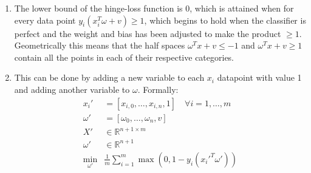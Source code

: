 \documentclass[11pt]{article}
\begin{document}
\begin{solution}
\begin{enumerate}
    \item The lower bound of the hinge-loss function is 0, which is attained when for every data point $y_i (x_i^T \omega + v) \geq 1$, which begins to hold when the classifier is perfect and the weight and bias has been adjusted to make the product $\geq 1$. Geometrically this means that the half spaces $\omega^T x + v \leq -1$ and $\omega^T x + v \geq 1$ contain all the points in each of their respective categories.

    \item This can be done by adding a new variable to each $x_i$ datapoint with value 1 and adding another variable to $\omega$. Formally:
    \begin{align*}
        x_i' &= [x_{i,0}, \dots, x_{i,n}, 1] \quad \forall i = 1, \dots, m \\
        \omega' &= [\omega_0, \dots, \omega_n, v] \\
        X' &\in \mathbb{R}^{n+1 \times m} \\
        \omega' &\in \mathbb{R}^{n+1} \\
        \min_{\omega'} &\frac{1}{m} \sum_{i=1}^m \max(0, 1 - y_i(x_i'^T \omega'))
    \end{align*}
\end{enumerate}
\end{solution}
\end{document}
